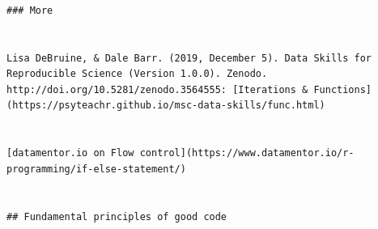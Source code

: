 \documentclass[]{book}
\begin{document}
\begin{verbatim}
                                                                                                                                                                                                                                                          
                                                                                                                                                                                                                                                          
                                                                                                                                                                                                                                                          ### More
                                                                                                                                                                                                                                                          
                                                                                                                                                                                                                                                          Lisa DeBruine, & Dale Barr. (2019, December 5). Data Skills for Reproducible Science (Version 1.0.0). Zenodo. http://doi.org/10.5281/zenodo.3564555: [Iterations & Functions](https://psyteachr.github.io/msc-data-skills/func.html)
                                                                                                                                                                                                                                                          
                                                                                                                                                                                                                                                          [datamentor.io on Flow control](https://www.datamentor.io/r-programming/if-else-statement/)
                                                                                                                                                                                                                                                          
                                                                                                                                                                                                                                                          ## Fundamental principles of good code
                                                                                                                                                                                                                                                          

\end{verbatim}
\end{document}
